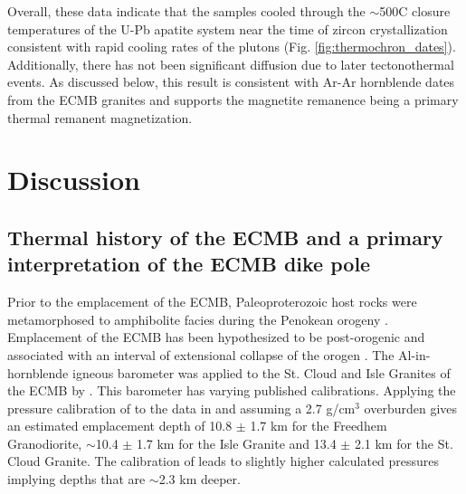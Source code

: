 \documentclass[draft]{agujournal2019}
\begin{document}
Overall, these data indicate that the samples cooled through the $\sim$500\textdegree C closure temperatures of the U-Pb apatite system near the time of zircon crystallization consistent with rapid cooling rates of the plutons (Fig. \ref{fig:thermochron_dates}). Additionally, there has not been significant diffusion due to later tectonothermal events. As discussed below, this result is consistent with Ar-Ar hornblende dates from the ECMB granites and supports the magnetite remanence being a primary thermal remanent magnetization.

\section{Discussion}

\subsection{Thermal history of the ECMB and a primary interpretation of the ECMB dike pole}

Prior to the emplacement of the ECMB, Paleoproterozoic host rocks were metamorphosed to amphibolite facies during the Penokean orogeny \cite{Holm1990a}. Emplacement of the ECMB has been hypothesized to be post-orogenic and associated with an interval of extensional collapse of the orogen \cite{Holm1998a, Boerboom2000a}. The Al-in-hornblende igneous barometer was applied to the St. Cloud and Isle Granites of the ECMB by . This barometer has varying published calibrations. Applying the pressure calibration of  to the data in  and assuming a 2.7 g/cm$^{3}$ overburden gives an estimated emplacement depth of 10.8 $\pm$ 1.7 km for the Freedhem Granodiorite, $\sim$10.4 $\pm$ 1.7 km for the Isle Granite and 13.4 $\pm$ 2.1 km for the St. Cloud Granite. The calibration of  leads to slightly higher calculated pressures implying depths that are $\sim$2.3 km deeper. 
\end{document}
